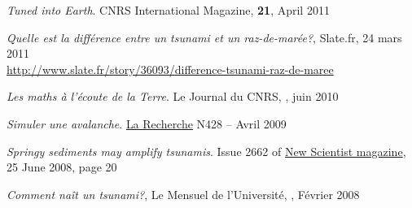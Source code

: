 \begin{etaremune}
  \item \textit{Tuned into Earth}. CNRS International Magazine, \textbf{21}, April 2011
  
  \item \textit{Quelle est la diff\'erence entre un tsunami et un raz-de-mar\'ee?}, Slate.fr, 24 mars 2011 \\ \url{http://www.slate.fr/story/36093/difference-tsunami-raz-de-maree}
  
  \item \textit{Les maths \`a l'\'ecoute de la Terre}. Le Journal du CNRS, , juin 2010
  
  \item \textit{Simuler une avalanche}. \href{http://www.larecherche.fr/}{La Recherche} N428 -- Avril 2009
  
  \item \textit{Springy sediments may amplify tsunamis}. Issue 2662 of \href{http://www.newscientist.com/}{New Scientist magazine}, 25 June 2008, page 20
  
  \item \textit{Comment na\^it un tsunami?}, Le Mensuel de l'Universit\'e, , F\'evrier 2008
  
\end{etaremune}